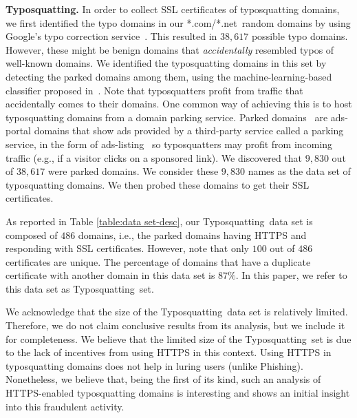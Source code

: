 \documentclass[twocolumn]{article}
\newcommand{\descr}[1]{\bigskip \noindent \textbf{#1}}
\newcommand{\phishing}{\textsf{Phishing}}
\newcommand{\typosquatting}{\textsf{Typosquatting}}
\newcommand{\comnet}{\textsf{*.com/*.net}}
\begin{document}
\descr{Typosquatting.} 
In order to collect SSL certificates of typosquatting domains,
we first identified the typo domains in our \comnet\ random domains  by 
using Google's typo correction service~\cite{GoogleSpellChecker}. This resulted in $38,617$ possible typo domains. 
However, these might be benign domains that {\em accidentally} resembled typos of well-known domains. 
We identified the typosquatting domains in this set by detecting the parked domains 
among them, using the machine-learning-based  classifier proposed in~\cite{ads-portal-class}.
Note that typosquatters profit 
from traffic that accidentally comes to their domains. 
One common way of achieving this is to host typosquatting domains from a domain parking 
service. Parked domains~\cite{parked} are ads-portal domains that 
show ads provided by a third-party service called a parking service, in the 
form of ads-listing~\cite{Wang} so typosquatters may profit from incoming traffic 
(e.g., if a visitor clicks on a sponsored link). 
We discovered that $9,830$ out of $38,617$ were parked domains. We consider these $9,830$ names 
as the data set of typosquatting domains. We then probed these domains to get their SSL certificates. 

As reported in Table \ref{table:data set-desc}, our \typosquatting\ data set is composed of $486$ domains, i.e., the parked domains 
having HTTPS and responding with SSL certificates.  However, note that only $100$ out of $486$ certificates are 
unique. The percentage of domains that have a duplicate certificate with another
domain in this data set is $87\%$. In this paper, we refer to this data set as \typosquatting\ set.

We acknowledge that the size of the \typosquatting\ data set is relatively limited. Therefore, we do not claim conclusive results
from its analysis, but we include it for completeness. We believe that the limited size of the \typosquatting\ set is due to the 
lack of incentives from using HTTPS in this context. Using HTTPS in typosquatting domains does not help in luring users 
(unlike \phishing). Nonetheless, we believe that, being the first of its kind, such an analysis of HTTPS-enabled typosquatting 
domains is interesting and shows an initial insight into this fraudulent activity. 
\end{document}
